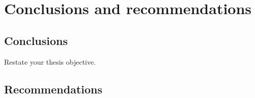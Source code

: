 \chapter{Conclusions and recommendations}
\label{chap: conclusions}
\thispagestyle{empty}

\section{Conclusions}

\lipsum[20-23]
Restate your thesis objective.

\vspace*{3mm}


\section{Recommendations}

\lipsum[1-4]